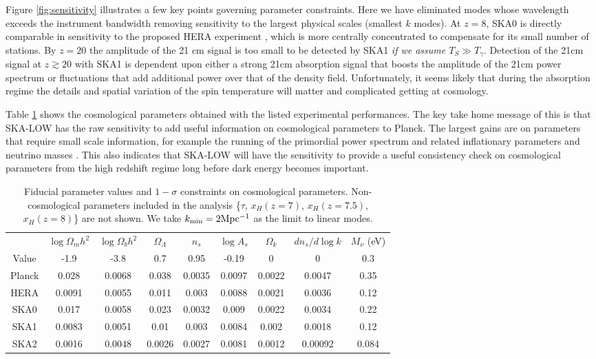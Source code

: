 \documentclass{PoS}
\begin{document}
Figure \ref{fig:sensitivity} illustrates a few key points governing parameter constraints. Here we have eliminated modes whose wavelength exceeds the instrument bandwidth removing sensitivity to the largest physical scales (smallest $k$ modes). At $z=8$, SKA0 is directly comparable in sensitivity to the proposed HERA experiment \citep{2014ApJ...782...66P}, which is more centrally concentrated to compensate for its small number of stations. By $z=20$ the amplitude of the 21 cm signal is too small to be detected by SKA1 {\em if we assume $T_S\gg T_\gamma$}. Detection of the 21cm signal at $z\gtrsim20$ with SKA1 is dependent upon either a strong 21cm absorption signal that boosts the amplitude of the 21cm power spectrum or fluctuations that add additional power over that of the density field. Unfortunately, it seems likely that during the absorption regime the details and spatial variation of the spin temperature will matter and complicated getting at cosmology.

Table \ref{tab:constraints} shows the cosmological parameters obtained with the listed experimental performances. The key take home message of this is that SKA-LOW has the raw sensitivity to add useful information on cosmological parameters to Planck. The largest gains are on parameters that require small scale information, for example the running of the primordial power spectrum and related inflationary parameters \citep{2009PhLB..673..173B,2011JCAP...02..021A} and neutrino masses \citep{2008PhRvD..78f5009P}. This also indicates that SKA-LOW will have the sensitivity to provide a useful consistency check on cosmological parameters from the high redshift regime long before dark energy becomes important.

\begin{table}[htdp]
\caption{Fiducial parameter values and $1-\sigma$ constraints on cosmological parameters. Non-cosmological parameters included in the analysis \{$\tau$, $x_H(z=7)$, $x_H(z=7.5)$, $x_H(z=8)$\} are not shown. We take $k_{\rm min}=2{\rm Mpc^{-1}}$ as the limit to linear modes.}
\begin{center}
\begin{tabular}{c|cccccccc}
\hline
 & $\log\Omega_mh^2$ & $\log\Omega_bh^2$ & $\Omega_\Lambda$ & $n_s$ & $\log A_s$ & $\Omega_k$ & $dn_s/d\log k$ & $M_\nu$ (eV) \\
Value & -1.9 & -3.8 & 0.7 & 0.95 & -0.19 & 0 & 0 & 0.3\\
\hline
Planck & 0.028 & 0.0068 & 0.038 & 0.0035 & 0.0097 & 0.0022 & 0.0047 & 0.35 \\
HERA & 0.0091 & 0.0055 & 0.011 & 0.003 & 0.0088 & 0.0021 & 0.0036 & 0.12  \\
SKA0 & 0.017 & 0.0058 & 0.023 & 0.0032 & 0.009 & 0.0022 & 0.0034 & 0.22  \\
SKA1 & 0.0083 & 0.0051 & 0.01 & 0.003 & 0.0084 & 0.002 & 0.0018 & 0.12  \\
SKA2 & 0.0016 & 0.0048 & 0.0026 & 0.0027 & 0.0081 & 0.0012 & 0.00092 & 0.084 
\end{tabular}
\end{center}
\label{tab:constraints}
\end{table}
\end{document}
